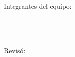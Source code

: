 	Integrantes del equipo: \\[0.2cm]
	\horrule{0.5pt} \\[0.2cm] %
	\horrule{0.5pt} \\[0.2cm] %
	\horrule{0.5pt} \\[0.2cm] %
	\horrule{0.5pt} %

	Revisó: \\[0.2cm]
	\horrule{0.5pt} \\%
    

